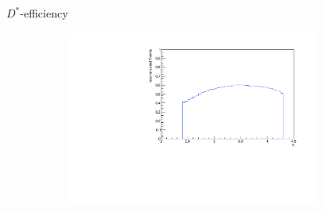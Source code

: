 \documentclass[11pt]{beamer}
\begin{document}
\begin{frame}{$D^*$-efficiency}
\begin{figure}
\begin{subfigure}{0.45\textwidth}
\end{subfigure}
\begin{subfigure}{0.45\textwidth}
\includegraphics[width=0.9\textwidth]{up_pdf/single/neg/h_eta_reco_Dst_neg.pdf}
\end{subfigure}
\end{figure}
\end{frame}
\end{document}
